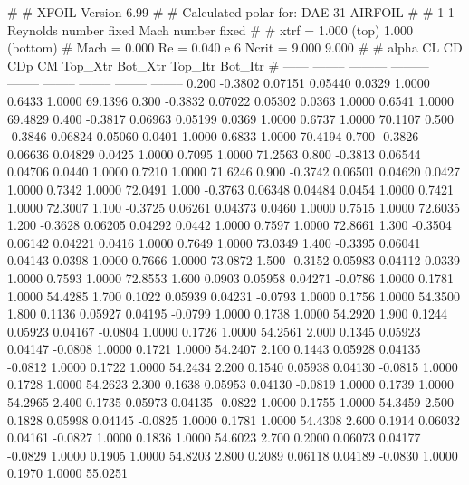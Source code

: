 #  
#       XFOIL         Version 6.99
#  
# Calculated polar for: DAE-31 AIRFOIL                                  
#  
# 1 1 Reynolds number fixed          Mach number fixed         
#  
# xtrf =   1.000 (top)        1.000 (bottom)  
# Mach =   0.000     Re =     0.040 e 6     Ncrit =   9.000  9.000
#  
#   alpha    CL        CD       CDp       CM     Top_Xtr  Bot_Xtr  Top_Itr  Bot_Itr
#  ------ -------- --------- --------- -------- -------- -------- -------- --------
   0.200  -0.3802   0.07151   0.05440   0.0329   1.0000   0.6433   1.0000  69.1396
   0.300  -0.3832   0.07022   0.05302   0.0363   1.0000   0.6541   1.0000  69.4829
   0.400  -0.3817   0.06963   0.05199   0.0369   1.0000   0.6737   1.0000  70.1107
   0.500  -0.3846   0.06824   0.05060   0.0401   1.0000   0.6833   1.0000  70.4194
   0.700  -0.3826   0.06636   0.04829   0.0425   1.0000   0.7095   1.0000  71.2563
   0.800  -0.3813   0.06544   0.04706   0.0440   1.0000   0.7210   1.0000  71.6246
   0.900  -0.3742   0.06501   0.04620   0.0427   1.0000   0.7342   1.0000  72.0491
   1.000  -0.3763   0.06348   0.04484   0.0454   1.0000   0.7421   1.0000  72.3007
   1.100  -0.3725   0.06261   0.04373   0.0460   1.0000   0.7515   1.0000  72.6035
   1.200  -0.3628   0.06205   0.04292   0.0442   1.0000   0.7597   1.0000  72.8661
   1.300  -0.3504   0.06142   0.04221   0.0416   1.0000   0.7649   1.0000  73.0349
   1.400  -0.3395   0.06041   0.04143   0.0398   1.0000   0.7666   1.0000  73.0872
   1.500  -0.3152   0.05983   0.04112   0.0339   1.0000   0.7593   1.0000  72.8553
   1.600   0.0903   0.05958   0.04271  -0.0786   1.0000   0.1781   1.0000  54.4285
   1.700   0.1022   0.05939   0.04231  -0.0793   1.0000   0.1756   1.0000  54.3500
   1.800   0.1136   0.05927   0.04195  -0.0799   1.0000   0.1738   1.0000  54.2920
   1.900   0.1244   0.05923   0.04167  -0.0804   1.0000   0.1726   1.0000  54.2561
   2.000   0.1345   0.05923   0.04147  -0.0808   1.0000   0.1721   1.0000  54.2407
   2.100   0.1443   0.05928   0.04135  -0.0812   1.0000   0.1722   1.0000  54.2434
   2.200   0.1540   0.05938   0.04130  -0.0815   1.0000   0.1728   1.0000  54.2623
   2.300   0.1638   0.05953   0.04130  -0.0819   1.0000   0.1739   1.0000  54.2965
   2.400   0.1735   0.05973   0.04135  -0.0822   1.0000   0.1755   1.0000  54.3459
   2.500   0.1828   0.05998   0.04145  -0.0825   1.0000   0.1781   1.0000  54.4308
   2.600   0.1914   0.06032   0.04161  -0.0827   1.0000   0.1836   1.0000  54.6023
   2.700   0.2000   0.06073   0.04177  -0.0829   1.0000   0.1905   1.0000  54.8203
   2.800   0.2089   0.06118   0.04189  -0.0830   1.0000   0.1970   1.0000  55.0251
